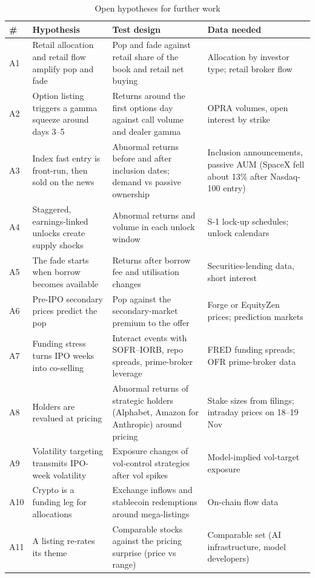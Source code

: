 \documentclass[11pt]{article}
\begin{document}
\begin{table}[!htbp]\centering\scriptsize
\caption{Open hypotheses for further work}\label{tab:hypopen}
\begin{tabularx}{\linewidth}{@{}p{0.5cm}p{3.4cm}YY@{}}
\toprule
\# & Hypothesis & Test design & Data needed \\
\midrule
A1 & Retail allocation and retail flow amplify pop and fade & Pop and fade against retail share of the book and retail net buying & Allocation by investor type; retail broker flow \\
A2 & Option listing triggers a gamma squeeze around days 3--5 & Returns around the first options day against call volume and dealer gamma & OPRA volumes, open interest by strike \\
A3 & Index fast entry is front-run, then sold on the news & Abnormal returns before and after inclusion dates; demand vs passive ownership & Inclusion announcements, passive AUM (SpaceX fell about 13\% after Nasdaq-100 entry) \\
A4 & Staggered, earnings-linked unlocks create supply shocks & Abnormal returns and volume in each unlock window & S-1 lock-up schedules; unlock calendars \\
A5 & The fade starts when borrow becomes available & Returns after borrow fee and utilisation changes & Securities-lending data, short interest \\
A6 & Pre-IPO secondary prices predict the pop & Pop against the secondary-market premium to the offer & Forge or EquityZen prices; prediction markets \\
A7 & Funding stress turns IPO weeks into co-selling & Interact events with SOFR--IORB, repo spreads, prime-broker leverage & FRED funding spreads; OFR prime-broker data \\
A8 & Holders are revalued at pricing & Abnormal returns of strategic holders (Alphabet, Amazon for Anthropic) around pricing & Stake sizes from filings; intraday prices on 18--19 Nov \\
A9 & Volatility targeting transmits IPO-week volatility & Exposure changes of vol-control strategies after vol spikes & Model-implied vol-target exposure \\
A10 & Crypto is a funding leg for allocations & Exchange inflows and stablecoin redemptions around mega-listings & On-chain flow data \\
A11 & A listing re-rates its theme & Comparable stocks against the pricing surprise (price vs range) & Comparable set (AI infrastructure, model developers) \\

\end{tabularx}
\end{table}
\end{document}
